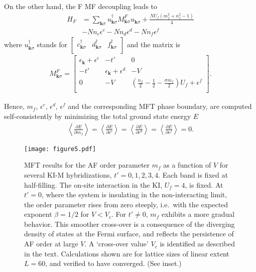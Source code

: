 \documentclass[pra,letterpaper,10pt,twocolumn]{revtex4}
\begin{document}
On the other hand, the F MF decoupling leads to
\begin{align}
  H_{F}&=\sum_{\textbf{k}\sigma}u^{\dagger}_{\textbf{k}\sigma}
  M^{F}_{\textbf{k}\sigma}
  u^{\phantom{\dagger}}_{\textbf{k}\sigma}+\frac{NU_f(m^2_f + n^2_f - 1)}{4} 
  \nonumber\\
  &-N n_c \epsilon^c - N n_d \epsilon^d - N n_f \epsilon^f
\label{eq:MFT_H_FM}
\end{align}
where $u^{\dagger}_{\textbf{k}\sigma}$ stands for $\left[ {\begin{array}{ccc}
   c^{\dagger}_{\textbf{k}\sigma} & d^{\dagger}_{\textbf{k}\sigma} & f^{\dagger}_{\textbf{k}\sigma} \\
  \end{array} } \right]$ and the matrix is
\begin{align}
  M^{F}_{\textbf{k}\sigma}=\left[ {\begin{array}{ccc}
   \epsilon_{\textbf{k}}+\epsilon^c & -t' & 0 \\
   -t' & \epsilon_{\textbf{k}}+\epsilon^d & -V \\
   0 & -V & (\frac{n_f}{2} - \frac{1}{2} - \frac{\sigma m_f}{2})U_f+\epsilon^f \\
  \end{array} } \right].
\nonumber
\end{align}

Hence, $m_f$, $\epsilon^c$, $\epsilon^d$, $\epsilon^f$ and the
corresponding MFT phase boundary,
are computed self-consistently by minimizing the total ground state energy $E$
\begin{align}
\left\langle \frac{\partial E}{\partial m_f}\right\rangle 
=\left\langle \frac{\partial E}{\partial \epsilon^c}\right\rangle 
=\left\langle \frac{\partial E}{\partial \epsilon^d}\right\rangle 
=\left\langle \frac{\partial E}{\partial \epsilon^f}\right\rangle 
= 0.
\end{align}
\begin{figure}[!h]
\texttt{[image: figure5.pdf]} 
\caption{
MFT results for the AF order parameter $m_f$ as a
function of $V$ for several KI-M hybridizations, $t'=0,1,2,3,4$. 
Each band is fixed at half-filling. 
The on-site interaction in the KI, $U_f=4$, is fixed.  At $t'=0$, where the
system is insulating in the non-interacting limit, the order parameter
rises from zero steeply, i.e.~with the expected exponent $\beta=1/2$ for
$V< V_c$.  For $t' \neq 0$, $m_f$ exhibits a more gradual behavior.
This smoother cross-over is a consequence of the diverging density of
states at the Fermi surface, and reflects the persistence of AF order at
large $V$.  A `cross-over value' $V_c$ is identified as described in
the text.  Calculations shown are for lattice sizes of linear extent
$L=60$, and verified to have converged. (See inset.) 
\label{fig:MFT_smooth}
}
\end{figure}
\end{document}
